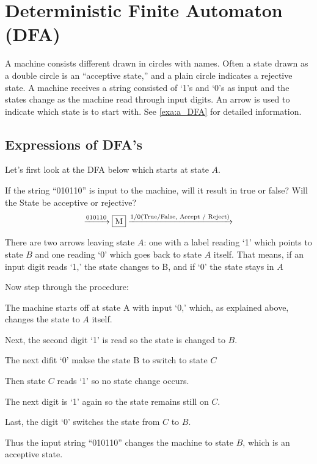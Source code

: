 
\section{Deterministic Finite Automaton (DFA)}

A machine consists different drawn in circles with names. Often a state drawn as
a double circle is an ``acceptive state,'' and a plain circle indicates a
rejective state. A machine receives a string consisted of `1's and `0's as input
and the states change as the machine read through input digits. An arrow is used
to indicate which state is to start with. See \autoref{exa:a_DFA} for detailed
information.

\subsection{Expressions of DFA's}
\begin{example}[A DFA]
    \label{exa:a_DFA}

    Let's first look at the DFA below which starts at state $A$.

    If the string ``010110'' is input to the machine, will it result in true or false?
    Will the State be acceptive or rejective?
    \[
        \xrightarrow{010110}
        \fbox{M}
        \xrightarrow{ 1/0 \text{(True/False, Accept / Reject)} }
    \]

    There are two arrows leaving state $A$: one with a label reading `1' which points to
    state $B$ and one reading `0' which goes back to state $A$ itself. That means, if an
    input digit reads `1,' the state changes to B, and if `0' the state stays in $A$

    Now step through the procedure:
    \begin{compactenum}
    \item
        The machine starts off at state A with input `0,' which, as explained above,
        changes the state to $A$ itself.
    \item
        Next, the second digit `1' is read so the state is changed to $B$.
    \item
        The next difit `0' makse the state B to switch to state $C$
    \item
        Then state $C$ reads `1' so no state change occurs.
    \item
        The next digit is `1' again so the state remains still on $C$.
    \item
        Last, the digit `0' switches the state from $C$ to $B$.
    \end{compactenum}
    Thus the input string ``010110'' changes the machine to state $B$, which is an
    acceptive state.

\end{example}

